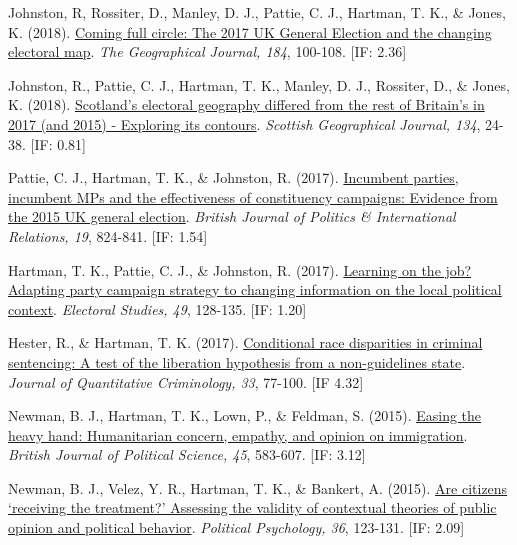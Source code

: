 \documentclass[12pt]{article}
\begin{document}
\begin{bibenum}
	\item Johnston, R, Rossiter, D., Manley, D. J., Pattie, C. J., 
		  {Hartman, T. K.}, \& Jones, K. (2018).
		  \href{https://10.1111/geoj.12240}
		  {Coming full circle: 
		  The 2017 UK General Election and the changing electoral map}. 
		  \emph{The Geographical Journal, 184}, 100-108. [IF: 2.36]
          
	\item Johnston, R., Pattie, C. J., {Hartman, T. K.}, Manley, D. J., 
		  Rossiter, D., \& Jones, K. (2018).
		  \href{https://10.1080/14702541.2017.1409362}
		  {Scotland's electoral geography 
		  differed from the rest of Britain's in 2017 (and 2015) - 
		  Exploring its contours}. 
		  \emph{Scottish Geographical Journal, 134}, 24-38. [IF: 0.81]
          
    \item Pattie, C. J., {Hartman, T. K.}, \& Johnston, R. (2017).
          \href{https://10.1177/1369148117718710}
          {Incumbent parties, incumbent MPs and the effectiveness of 
          constituency campaigns: Evidence from the 2015 UK general election}.
           \emph{British Journal of Politics \& International Relations, 19}, 
           824-841. [IF: 1.54]
          
    \item {Hartman, T. K.}, Pattie, C. J., \& Johnston, R. (2017).
    		\href{https://10.1016/j.electstud.2017.06.005}
          {Learning on the job? Adapting party campaign strategy 
          to changing information on the local political context}. 
          \emph{Electoral Studies, 49}, 128-135. [IF: 1.20]
          
    \item Hester, R., \& {Hartman, T. K.} (2017). 
          \href{https://10.1007/s10940-016-9283-z}
          {Conditional race disparities in criminal sentencing: 
          A test of the liberation hypothesis from a non-guidelines state}. 
          \emph{Journal of Quantitative Criminology, 33}, 77-100. [IF 4.32]
          
    \item Newman, B. J., {Hartman, T. K.}, Lown, P., \& Feldman, S. (2015). 
          \href{https://10.1017/S0007123413000410}
          {Easing the heavy hand: Humanitarian concern, empathy, and 
          opinion on immigration}. 
          \emph{British Journal of Political Science, 45}, 583-607. [IF: 3.12]
           
    \item *Newman, B. J., Velez, Y. R., {Hartman, T. K.}, \& Bankert, A. (2015). 
          \href{https://10.1111/pops.12069}
          {Are citizens `receiving the treatment?' Assessing the validity 
          of contextual theories of public opinion and political behavior}. 
          \emph{Political Psychology, 36}, 123-131. [IF: 2.09]


\end{bibenum}
\end{document}
